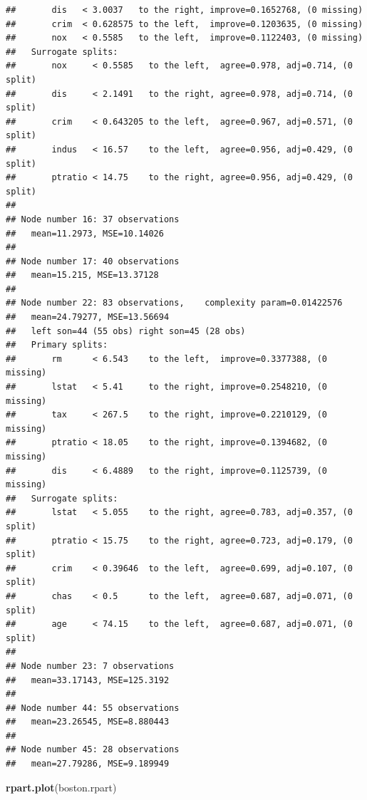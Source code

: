 \documentclass[
]{book}
\newenvironment{Shaded}{\begin{snugshade}}{\end{snugshade}}
\newcommand{\FunctionTok}[1]{\textcolor[rgb]{0.13,0.29,0.53}{\textbf{#1}}}
\newcommand{\NormalTok}[1]{#1}
\theoremstyle{plain}
\theoremstyle{definition}
\theoremstyle{definition}
\theoremstyle{definition}
\theoremstyle{definition}
\theoremstyle{definition}
\theoremstyle{remark}
\begin{document}
\begin{verbatim}
##       dis   < 3.0037   to the right, improve=0.1652768, (0 missing)
##       crim  < 0.628575 to the left,  improve=0.1203635, (0 missing)
##       nox   < 0.5585   to the left,  improve=0.1122403, (0 missing)
##   Surrogate splits:
##       nox     < 0.5585   to the left,  agree=0.978, adj=0.714, (0 split)
##       dis     < 2.1491   to the right, agree=0.978, adj=0.714, (0 split)
##       crim    < 0.643205 to the left,  agree=0.967, adj=0.571, (0 split)
##       indus   < 16.57    to the left,  agree=0.956, adj=0.429, (0 split)
##       ptratio < 14.75    to the right, agree=0.956, adj=0.429, (0 split)
## 
## Node number 16: 37 observations
##   mean=11.2973, MSE=10.14026 
## 
## Node number 17: 40 observations
##   mean=15.215, MSE=13.37128 
## 
## Node number 22: 83 observations,    complexity param=0.01422576
##   mean=24.79277, MSE=13.56694 
##   left son=44 (55 obs) right son=45 (28 obs)
##   Primary splits:
##       rm      < 6.543    to the left,  improve=0.3377388, (0 missing)
##       lstat   < 5.41     to the right, improve=0.2548210, (0 missing)
##       tax     < 267.5    to the right, improve=0.2210129, (0 missing)
##       ptratio < 18.05    to the right, improve=0.1394682, (0 missing)
##       dis     < 6.4889   to the right, improve=0.1125739, (0 missing)
##   Surrogate splits:
##       lstat   < 5.055    to the right, agree=0.783, adj=0.357, (0 split)
##       ptratio < 15.75    to the right, agree=0.723, adj=0.179, (0 split)
##       crim    < 0.39646  to the left,  agree=0.699, adj=0.107, (0 split)
##       chas    < 0.5      to the left,  agree=0.687, adj=0.071, (0 split)
##       age     < 74.15    to the left,  agree=0.687, adj=0.071, (0 split)
## 
## Node number 23: 7 observations
##   mean=33.17143, MSE=125.3192 
## 
## Node number 44: 55 observations
##   mean=23.26545, MSE=8.880443 
## 
## Node number 45: 28 observations
##   mean=27.79286, MSE=9.189949
\end{verbatim}

\begin{Shaded}
\begin{Highlighting}[]
\FunctionTok{rpart.plot}\NormalTok{(boston.rpart)}
\end{Highlighting}
\end{Shaded}
\end{document}
